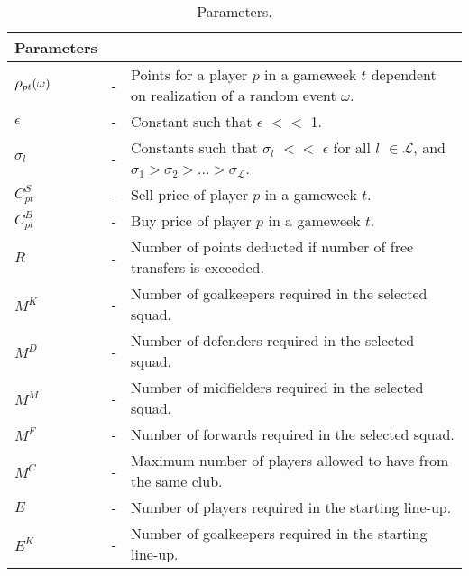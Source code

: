 \begin{table}[H]
\tabcolsep=0.11cm
\centering
\caption{Parameters.}
\begin{tabular}{@{}lll@{}}
\toprule
Parameters                       &   &                                                                                                \\ \midrule
$\mathlarger{\rho_{pt}(\omega)}$ & - & Points for a player $p$ in a gameweek $t$ dependent on realization of a random event $\omega$. \\
$\epsilon$                       & - & Constant such that $\epsilon$ $<<$ 1.                                                                     \\
$\sigma_{l}$                     & - & Constants such that $\sigma_{l}$ $<<$ $\epsilon$ for all $l$ $\in \mathcal{L}$, and $\sigma_{1} > \sigma_{2} > \ldots > \sigma_{\mathcal{L}}$.                                               \\
$C_{pt}^{S}$                     & - & Sell price of player $p$ in a gameweek $t$.                                                    \\
$C_{pt}^{B}$                     & - & Buy price of player $p$ in a gameweek $t$.                                                     \\
$R$                              & - & Number of points deducted if number of free transfers is exceeded.        \\
$M^{K}$                          & - & Number of goalkeepers required in the selected squad.                                           \\
$M^{D}$                          & - & Number of defenders required in the selected squad.                                             \\
$M^{M}$                          & - & Number of midfielders required in the selected squad.                                           \\
$M^{F}$                          & - & Number of forwards required in the selected squad.                                              \\
$M^{C}$                          & - & Maximum number of players allowed to have from the same club.                                         \\
$E$                              & - & Number of players required in the starting line-up.                                               \\
$E^{K}$                          & - & Number of goalkeepers required in the starting line-up.                                           \\

\end{tabular}
\end{table}

